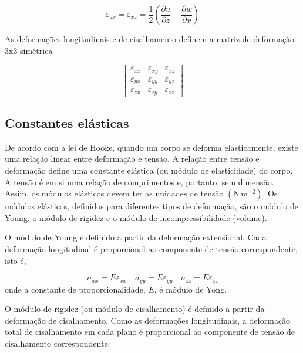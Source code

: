 \documentclass[]{book}
\theoremstyle{definition}
\theoremstyle{definition}
\theoremstyle{definition}
\theoremstyle{remark}
\begin{document}
\begin{equation}
\varepsilon_{zx}= \varepsilon_{xz} = \frac{1}{2}\left(\frac{\partial u}{\partial z} + \frac{\partial w}{\partial x}\right)\label{eq:0313}
\end {equation}

As deformações longitudinais e de cisalhamento definem a matriz de deformação 3x3 simétrica

\begin{equation}
\left[ \begin{array}{lll}{\varepsilon_{x x}} & {\varepsilon_{x y}} & {\varepsilon_{x z}} \\ {\varepsilon_{y x}} & {\varepsilon_{y y}} & {\varepsilon_{y z}} \\ {\varepsilon_{z x}} & {\varepsilon_{z y}} & {\varepsilon_{z z}}\end{array}\right] \label{eq:0314}
\end{equation}

\hypertarget{constantes-elasticas}{%
\subsection{Constantes elásticas}\label{constantes-elasticas}}

De acordo com a lei de Hooke, quando um corpo se deforma elasticamente, existe uma relação linear entre deformação e tensão. A relação entre tensão e deformação define uma constante elástica (ou módulo de elasticidade) do corpo. A tensão é em si uma relação de comprimentos e, portanto, sem dimensão. Assim, os módulos elásticos devem ter as unidades de tensão \((\mathrm{N}\,\mathrm{m}^{-2})\). Os módulos elásticos, definidos para diferentes tipos de deformação, são o módulo de Young, o módulo de rigidez e o módulo de incompressibilidade (volume).

O módulo de Young é definido a partir da deformação extensional. Cada deformação longitudinal é proporcional ao componente de tensão correspondente, isto é,

\[
\sigma_{x x}=E \varepsilon_{x x} \quad \sigma_{y y}=E \varepsilon_{y y}\quad \sigma_{z z}=E \varepsilon_{z z}
\]
onde a constante de proporcionalidade, \(E\), é módulo de Yong.

O módulo de rigidez (ou módulo de cisalhamento) é definido a partir da deformação de cisalhamento. Como as deformações longitudinais, a deformação total de cisalhamento em cada plano é proporcional ao componente de tensão de cisalhamento correspondente:
\end{document}

